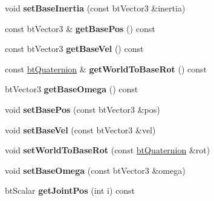 \begin{DoxyCompactItemize}
\item 
\mbox{\label{classbtMultiBody_a4043d6629d0585f67c8a82d0274ff17c}} 
void {\bfseries set\+Base\+Inertia} (const bt\+Vector3 \&inertia)
\item 
\mbox{\label{classbtMultiBody_a6ab72a604e9b46014ffe25ff382fccb8}} 
const bt\+Vector3 \& {\bfseries get\+Base\+Pos} () const
\item 
\mbox{\label{classbtMultiBody_af47f09548d54af89ff1ae56e8559114e}} 
const bt\+Vector3 {\bfseries get\+Base\+Vel} () const
\item 
\mbox{\label{classbtMultiBody_a621aef7b0eea3c88b2a915152f568df8}} 
const \hyperlink{classbtQuaternion}{bt\+Quaternion} \& {\bfseries get\+World\+To\+Base\+Rot} () const
\item 
\mbox{\label{classbtMultiBody_a6ba0afb89acd01b4842959c2d53f7d81}} 
bt\+Vector3 {\bfseries get\+Base\+Omega} () const
\item 
\mbox{\label{classbtMultiBody_a7860a23d986ca40ca24112fc4870e9db}} 
void {\bfseries set\+Base\+Pos} (const bt\+Vector3 \&pos)
\item 
\mbox{\label{classbtMultiBody_a559187909a25d3fb42140abf079d84cd}} 
void {\bfseries set\+Base\+Vel} (const bt\+Vector3 \&vel)
\item 
\mbox{\label{classbtMultiBody_aea1adaa2e8f6bf164abe19275427dcea}} 
void {\bfseries set\+World\+To\+Base\+Rot} (const \hyperlink{classbtQuaternion}{bt\+Quaternion} \&rot)
\item 
\mbox{\label{classbtMultiBody_a56c0cf6a7bfccf1d3512933955d5127f}} 
void {\bfseries set\+Base\+Omega} (const bt\+Vector3 \&omega)
\item 
\mbox{\label{classbtMultiBody_a3aeea8cbd49121e61ee785aad78e3665}} 
bt\+Scalar {\bfseries get\+Joint\+Pos} (int i) const
\item 
\mbox{\label{classbtMultiBody_aebc99e02b1e126ecc8085b7b4965c489}} 

\end{DoxyCompactItemize}
